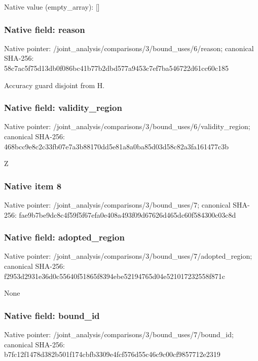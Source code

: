 \documentclass[10pt,a4paper]{article}
\begin{document}
Native value (empty\_\allowbreak{}array): []

\subsubsection{Native field: reason}
Native pointer: /joint\_\allowbreak{}analysis/comparisons/3/bound\_\allowbreak{}uses/6/reason; canonical SHA-256: 58c7ac5f75d13db0f086bc41b77b2dbd577a9453c7ef7ba546722d61cc60c185

\begingroup\raggedright\sloppy Accuracy guard disjoint from H.\par\endgroup

\subsubsection{Native field: validity\_\allowbreak{}region}
Native pointer: /joint\_\allowbreak{}analysis/comparisons/3/bound\_\allowbreak{}uses/6/validity\_\allowbreak{}region; canonical SHA-256: 468bcc9e8c2c33fb07e7a3b88170dd5e81a8a0ba85d03d58c82a3fa161477c3b

\begingroup\raggedright\sloppy Z\par\endgroup

\subsubsection{Native item 8}
Native pointer: /joint\_\allowbreak{}analysis/comparisons/3/bound\_\allowbreak{}uses/7; canonical SHA-256: fae9b7be9dc8c4f59f5f67efa0e408a493f09d67626d465dc60f584300c03c8d

\subsubsection{Native field: adopted\_\allowbreak{}region}
Native pointer: /joint\_\allowbreak{}analysis/comparisons/3/bound\_\allowbreak{}uses/7/adopted\_\allowbreak{}region; canonical SHA-256: f2953d2931e36d0c55640f51865f8394ebe52194765d04e521017232558f871c

\begingroup\raggedright\sloppy None\par\endgroup

\subsubsection{Native field: bound\_\allowbreak{}id}
Native pointer: /joint\_\allowbreak{}analysis/comparisons/3/bound\_\allowbreak{}uses/7/bound\_\allowbreak{}id; canonical SHA-256: b7fc12f1478d382b501f174cbfb3309e4fcf576d55c46c9c00cf9857712e2319
\end{document}
